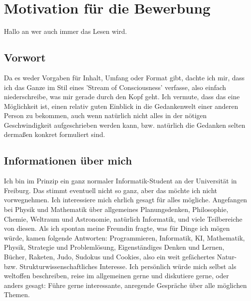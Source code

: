 \documentclass{scrartcl}
\begin{document}
\section*{Motivation für die Bewerbung}

Hallo an wer auch immer das Lesen wird. \\


\subsection*{Vorwort}

Da es weder Vorgaben für Inhalt, Umfang oder Format gibt, dachte ich mir, dass ich das Ganze
im Stil eines 'Stream of Consciousness' verfasse, also einfach niederschreibe, was mir gerade
durch den Kopf geht. Ich vermute, dass das eine Möglichkeit ist, einen relativ guten Einblick
in die Gedankenwelt einer anderen Person zu bekommen, auch wenn natürlich nicht alles in der
nötigen Geschwindigkeit aufgeschrieben werden kann, bzw. natürlich die Gedanken selten dermaßen
konkret formuliert sind.  \\


\subsection*{Informationen über mich}

Ich bin im Prinzip ein ganz normaler Informatik-Student an der Universität in Freiburg. Das
stimmt eventuell nicht so ganz, aber das möchte ich nicht vorwegnehmen. Ich interessiere mich
ehrlich gesagt für alles mögliche. Angefangen bei Physik und Mathematik über allgemeines
Planungsdenken, Philosophie, Chemie, Weltraum und Astronomie, natürlich Informatik, und viele
Teilbereiche von diesen.
Als ich spontan meine Freundin fragte, was für Dinge ich mögen würde, kamen folgende Antworten:
Programmieren, Informatik, KI, Mathematik, Physik, Strategie und Problemlösung,
Eigenständiges Denken und Lernen, Bücher, Raketen, Judo, Sudokus und Cookies, also ein weit
gefächertes Natur- bzw. Strukturwissenschaftliches Interesse.
Ich persönlich würde mich selbst als weltoffen beschreiben, reise im allgemeinen gerne
und diskutiere gerne, oder anders gesagt: Führe gerne interessante, anregende Gespräche über
alle möglichen Themen.
\end{document}
